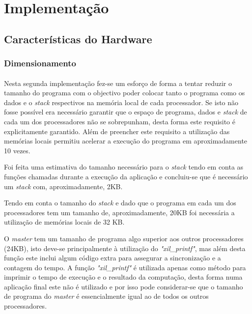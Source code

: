 \section{Implementação}

\subsection{Características do Hardware}

\subsubsection{Dimensionamento} 

\paragraph{} Nesta segunda implementação fez-se um esforço de forma a tentar reduzir o tamanho do programa com o objectivo poder colocar tanto o programa como os dados e o \textit{stack} respectivos na memória local de cada processador. Se isto não fosse possível era necessário garantir que o espaço de programa, dados e \textit{stack} de cada um dos processadores não se sobrepunham, desta forma este requisito é explicitamente garantido. Além de preencher este requisito a utilização das memórias locais permitiu acelerar a execução do programa em aproximadamente 10 vezes.

Foi feita uma estimativa do tamanho necessário para o \textit{stack} tendo em conta as funções chamadas durante a execução da aplicação e concluiu-se que é necessário um \textit{stack} com, aproximadamente, 2KB.

Tendo em conta o tamanho do \textit{stack} e dado que o programa em cada um dos processadores tem um tamanho de, aproximadamente, 20KB foi necessária a utilização de memórias locais de 32 KB.

O \textit{master} tem um tamanho de programa algo superior aos outros processadores (24KB), isto deve-se principalmente à utilização do \textit{"xil\_printf"}, mas além desta função este inclui algum código extra para assegurar a sincronização e a contagem do tempo. A função \textit{"xil\_printf"} é utilizada apenas como método para imprimir o tempo de execução e o resultado da computação, desta forma numa aplicação final este não é utilizado e por isso pode considerar-se que o tamanho de programa do \textit{master} é essencialmente igual ao de todos os outros processadores.

